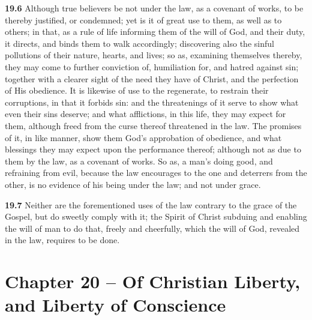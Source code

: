 \par\textbf{19.6} Although true believers be not under the law, as a covenant of works, to be thereby justified, or condemned; yet is it of great use to them, as well as to others; in that, as a rule of life informing them of the will of God, and their duty, it directs, and binds them to walk accordingly; discovering also the sinful pollutions of their nature, hearts, and lives; so as, examining themselves thereby, they may come to further conviction of, humiliation for, and hatred against sin; together with a clearer sight of the need they have of Christ, and the perfection of His obedience. It is likewise of use to the regenerate, to restrain their corruptions, in that it forbids sin: and the threatenings of it serve to show what even their sins deserve; and what afflictions, in this life, they may expect for them, although freed from the curse thereof threatened in the law. The promises of it, in like manner, show them God's approbation of obedience, and what blessings they may expect upon the performance thereof; although not as due to them by the law, as a covenant of works. So as, a man's doing good, and refraining from evil, because the law encourages to the one and deterrers from the other, is no evidence of his being under the law; and not under grace.   

\par\textbf{19.7} Neither are the forementioned uses of the law contrary to the grace of the Gospel, but do sweetly comply with it; the Spirit of Christ subduing and enabling the will of man to do that, freely and cheerfully, which the will of God, revealed in the law, requires to be done.

\section{Chapter 20 -- Of Christian Liberty, and Liberty of Conscience}

